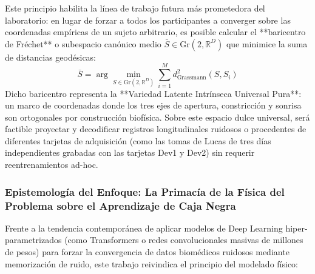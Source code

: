 \documentclass[11pt,a4paper,openany]{book}
\theoremstyle{definition}
\begin{document}
Este principio habilita la línea de trabajo futura más prometedora del laboratorio: en lugar de forzar a todos los participantes a converger sobre las coordenadas empíricas de un sujeto arbitrario, es posible calcular el **baricentro de Fréchet** o subespacio canónico medio $\bar{S} \in \text{Gr}(2, \mathbb{R}^D)$ que minimice la suma de distancias geodésicas:
\begin{equation}
\bar{S} = \arg\min_{S \in \text{Gr}(2, \mathbb{R}^D)} \sum_{i=1}^M d_{\text{Grassmann}}^2(S, S_i)
\end{equation}
Dicho baricentro representa la **Variedad Latente Intrínseca Universal Pura**: un marco de coordenadas donde los tres ejes de apertura, constricción y sonrisa son ortogonales por construcción biofísica. Sobre este espacio dulce universal, será factible proyectar y decodificar registros longitudinales ruidosos o procedentes de diferentes tarjetas de adquisición (como las tomas de Lucas de tres días independientes grabadas con las tarjetas Dev1 y Dev2) sin requerir reentrenamientos ad-hoc.

\subsubsection{Epistemología del Enfoque: La Primacía de la Física del Problema sobre el Aprendizaje de Caja Negra}
\label{subsubsec:primacia_fisica_sobre_caja_negra}

Frente a la tendencia contemporánea de aplicar modelos de Deep Learning hiper-parametrizados (como Transformers o redes convolucionales masivas de millones de pesos) para forzar la convergencia de datos biomédicos ruidosos mediante memorización de ruido, este trabajo reivindica el principio del modelado físico:
\end{document}
